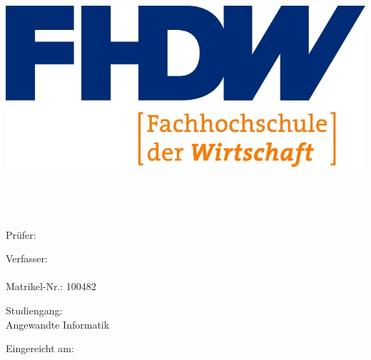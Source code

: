 
\begin{titlepage}

    \begin{center}


        \includegraphics[scale=1.20]{img/fhdw}\\

        \vspace{.6cm}

        \Huge{\bfseries\dokumententyp}

        ~\vspace{.2cm}\\

        \LARGE{\dokumententitel}

        ~\vspace{.2cm}\\


        \large{

            Prüfer:\\\vspace{1mm}

            \dokumentenpruefer

            \vspace{.5cm}

            Verfasser:\vspace{1mm}\\

            \dokumentenautor\\
            Matrikel-Nr.: 100482\\

            \dokumentenautoradress

            \vspace{.5cm}

            Studiengang:\vspace{1mm}\\
            Angewandte Informatik

            \vspace{.6cm}

            Eingereicht am:\vspace{1mm}\\

            \abgabedatum

        }

    \end{center}


\end{titlepage}

